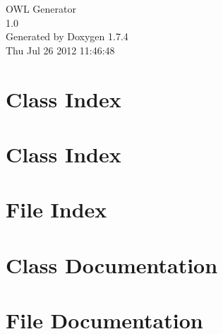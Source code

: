 \documentclass[a4paper]{book}
\begin{document}
\hypersetup{pageanchor=false}
\begin{titlepage}
\vspace*{7cm}
\begin{center}
{\Large OWL Generator \\[1ex]\large 1.0 }\\
\vspace*{1cm}
{\large Generated by Doxygen 1.7.4}\\
\vspace*{0.5cm}
{\small Thu Jul 26 2012 11:46:48}\\
\end{center}
\end{titlepage}
\clearemptydoublepage
{}
\tableofcontents
\clearemptydoublepage
{}
\hypersetup{pageanchor=true}
\chapter{Class Index}

\chapter{Class Index}

\chapter{File Index}

\chapter{Class Documentation}












\chapter{File Documentation}












\printindex
\end{document}
